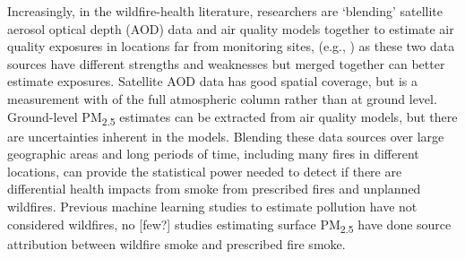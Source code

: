 \documentclass[authoryear]{elsarticle}
\begin{document}
Increasingly, in the wildfire-health literature, researchers are `blending' satellite aerosol optical depth (AOD) data and air quality models together to estimate air quality exposures in locations far from monitoring sites, (e.g., \citealt{Reid2016EnvRes,Reid2015,vanDonkelaar2011,Gan2017}) as these two data sources have different strengths and weaknesses but merged together can better estimate exposures. 
Satellite AOD data has good spatial coverage, but is a measurement with of the full atmospheric column rather than at ground level. Ground-level PM\textsubscript{2.5} estimates can be extracted from air quality models, but there are uncertainties inherent in the models.
Blending these data sources over large geographic areas and long periods of time, including many fires in different locations, can provide the statistical power needed to detect if there are differential health impacts from smoke from prescribed fires and unplanned wildfires.
Previous machine learning studies to estimate pollution have not considered wildfires, no [few?] studies estimating surface PM\textsubscript{2.5} have done source attribution between wildfire smoke and prescribed fire smoke.
\end{document}
